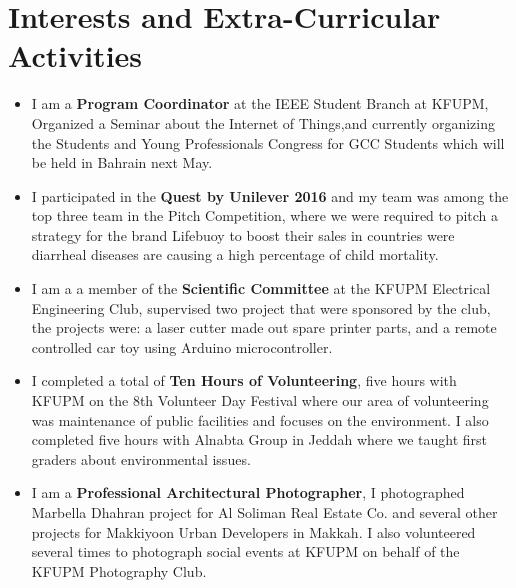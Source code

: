 \documentclass[11pt,a4paper,sans]{moderncv}        %
\begin{document}
\section{Interests and Extra-Curricular Activities}

\vspace{6pt}

\begin{itemize}

\item{I am a \textbf{Program Coordinator} at the IEEE Student Branch at KFUPM, Organized a Seminar about the Internet of Things,and currently organizing the Students and Young Professionals Congress for GCC Students which will be held in Bahrain next May.}

\vspace{6pt}

\item{I participated in the \textbf{Quest by Unilever 2016} and my team was among the top three team in the Pitch Competition, where we were required to pitch a strategy for the brand Lifebuoy to boost their sales in countries were diarrheal diseases are causing a high percentage of child mortality.}

\vspace{6pt}

\item{I am a a member of the \textbf{Scientific Committee} at the KFUPM Electrical Engineering Club, supervised two project that were sponsored by the club, the projects were: a laser cutter made out spare printer parts, and a remote controlled car toy using Arduino microcontroller.}

\vspace{6pt}

\item{I completed a total of \textbf{Ten Hours of Volunteering}, five hours with KFUPM on the 8th Volunteer Day Festival where our area of volunteering was maintenance of public facilities and focuses on the environment. I also completed five hours with Alnabta Group in Jeddah where we taught first graders about environmental issues.}

\vspace{6pt}

\item{I am a \textbf{Professional Architectural Photographer}, I photographed Marbella Dhahran project for Al Soliman Real Estate Co. and several other projects for Makkiyoon Urban Developers in Makkah. I also volunteered several times to photograph social events at KFUPM on behalf of the KFUPM Photography Club.}


\end{itemize}
\end{document}
